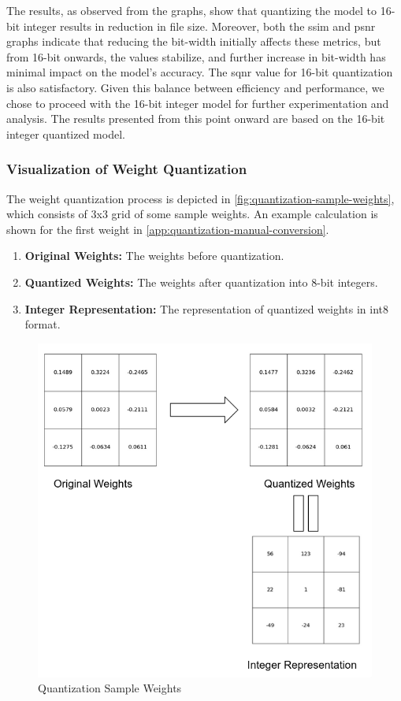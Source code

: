 \documentclass{ioereport}
\begin{document}
    The results, as observed from the graphs, show that quantizing the model to 16-bit integer results in reduction in file size. Moreover, both the \gls{ssim} and \gls{psnr} graphs indicate that reducing the bit-width initially affects these metrics, but from 16-bit onwards, the values stabilize, and further increase in bit-width has minimal impact on the model's accuracy. The \gls{sqnr} value for 16-bit quantization is also satisfactory. Given this balance between efficiency and performance, we chose to proceed with the 16-bit integer model for further experimentation and analysis. The results presented from this point onward are based on the 16-bit integer quantized model.

    \subsubsection{Visualization of Weight Quantization}
    The weight quantization process is depicted in \autoref{fig:quantization-sample-weights}, which consists of 3x3 grid of some sample weights. An example calculation is shown for the first weight in \autoref{app:quantization-manual-conversion}.
    \begin{enumerate}[label=\textbf{\roman*.}]
        \item \textbf{Original Weights:} The weights before quantization.
        \item \textbf{Quantized Weights:} The weights after quantization into 8-bit integers.
        \item \textbf{Integer Representation:} The representation of quantized weights in int8 format.
    \end{enumerate}

    \begin{figure}[H]
        \centering
        \includegraphics[width=0.8\linewidth]{assets/quantization/quantization_sample_weights.png}
        \caption{Quantization Sample Weights}
        \label{fig:quantization-sample-weights}
    \end{figure}
\end{document}
